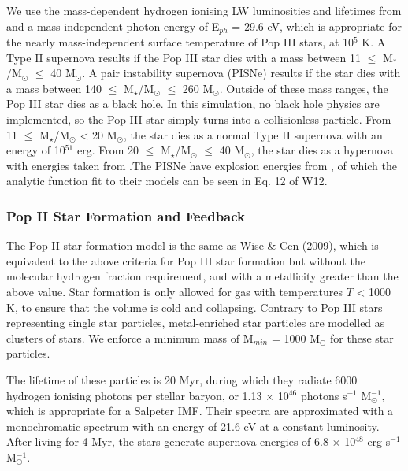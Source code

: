 \documentclass[a4paper,fleqn,usenatbib]{mnras}
\begin{document}
We use the mass-dependent hydrogen ionising LW luminosities and lifetimes from \citet{Schaerer02} and a mass-independent photon energy of E$_{ph}$ = 29.6 eV, which is appropriate for the nearly mass-independent surface temperature of Pop III stars, at 10$^{5}$ K. A Type II supernova results if the Pop III star dies with a mass between 11 $\leq$ M$_{\ast}$/M$_{\odot}$ $\leq$ 40 M$_{\odot}$. A pair instability supernova (PISNe) results if the star dies with a mass between 140 $\leq$ M$_{\star}$/M$_{\odot}$ $\leq$ 260 M$_{\odot}$. Outside of these mass ranges, the Pop III star dies as a black hole. In this simulation, no black hole physics are implemented, so the Pop III star simply turns into a collisionless particle. From 11 $\leq$ M$_{\star}$/M$_{\odot}$ < 20 M$_{\odot}$, the star dies as a normal Type II supernova with an energy of 10$^{51}$ erg. From 20 $\leq$ M$_{\star}$/M$_{\odot}$ $\leq$ 40 M$_{\odot}$, the star dies as a hypernova with energies taken from \citet{Nomoto06}.The PISNe have explosion energies from \citet{2002ApJ...567..532H}, of which the analytic function fit to their models can be seen in Eq. 12 of W12. 

\subsubsection{Pop II  Star Formation and Feedback}
The Pop II star formation model is the same as Wise \& Cen (2009), which is equivalent to the above criteria for Pop III star formation but without the molecular hydrogen fraction requirement, and with a metallicity greater than the above value. Star formation is only allowed for gas with temperatures $T$ < 1000 K, to ensure that the volume is cold and collapsing. Contrary to Pop III stars representing single star particles, metal-enriched star particles are modelled as clusters of stars. We enforce a minimum mass of M$_{min}$ = 1000 M$_{\odot}$ for these star particles. 

The lifetime of these particles is 20 Myr, during which they radiate 6000 hydrogen ionising photons per stellar baryon, or 1.13 $\times$ 10$^{46}$ photons s$^{-1}$ M$_{\odot}^{-1}$, which is appropriate for a Salpeter IMF. Their spectra are approximated with a monochromatic spectrum with an energy of 21.6 eV at a constant luminosity. After living for 4 Myr, the stars generate supernova energies of 6.8 $\times$ 10$^{48}$ erg s$^{-1}$ M$_{\odot}^{-1}$.
\end{document}
